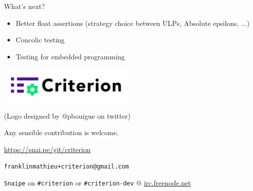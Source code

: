 \documentclass[10pt]{beamer}
\begin{document}
\begin{frame}[fragile]{What's next?}
  \begin{itemize}
    \item Better float assertions (strategy choice between ULPs, Absolute epsilons, ...)
    \item Concolic testing
    \item Testing for embedded programming
  \end{itemize}

  \begin{center}
    \includegraphics[height=50pt]{criterion.png}

    \small (Logo designed by @pbouigue on twitter) \normalsize

    Any sensible contribution is welcome.

    \large \faGithub \normalsize\hspace{0.7em}
    \url{https://snai.pe/git/criterion}

    \large \faEnvelope \normalsize\hspace{0.7em}
    \verb|franklinmathieu+criterion@gmail.com|

    \verb|Snaipe| on \verb|#criterion| or \verb|#criterion-dev| @ \url{irc.freenode.net}

  \end{center}
\end{frame}

\end{document}
